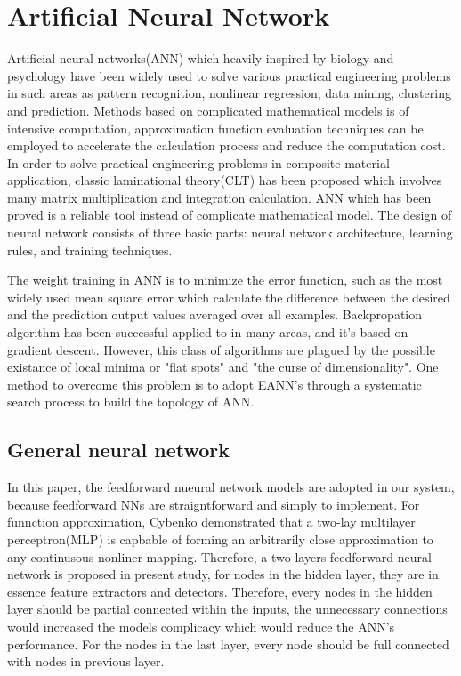 \section{Artificial Neural Network}
Artificial neural networks(ANN) which heavily inspired by biology and psychology
have been widely used to solve various practical engineering problems in such
areas as pattern recognition, nonlinear regression, data mining, clustering and
prediction. Methods based on complicated mathematical models is of intensive
computation, approximation function evaluation techniques can be employed to
accelerate the calculation process and reduce the computation cost. In order to
solve practical engineering problems in composite material application, classic
laminational theory(CLT) has been proposed which involves many matrix
multiplication and integration calculation. ANN which has been proved is a
reliable tool instead of complicate mathematical model.  The design of neural
network consists of three basic parts: neural network architecture, learning
rules, and training techniques.

The weight training in ANN is to minimize the error function, such as the most
widely used mean square error which calculate the difference  between the
desired and the prediction output values averaged over all examples.
Backpropation algorithm has been successful applied to in many areas, and it's
based on gradient descent. However, this class of algorithms are  plagued by
the possible existance of local minima or "flat spots" and "the curse of
dimensionality". One method to overcome this problem is to adopt
EANN's\cite{yao1999evolving} through a systematic search process\cite{elsken2019neural} to build
the topology of ANN.

\subsection{General neural network}

In this paper, the feedforward nueural network models are adopted in our
system, because feedforward NNs are straigntforward and simply to implement.  For
funnction approximation, Cybenko demonstrated that a two-lay multilayer
perceptron(MLP) is capbable of forming an arbitrarily close approximation to
any continusous nonliner mapping\cite{cybenko1989approximation}. Therefore, a
two layers feedforward neural network is proposed in present study, for nodes
in the hidden layer, they are in essence feature extractors and detectors.
Therefore, every nodes in the hidden layer should be partial connected within
the inputs, the unnecessary connections would increased the models complicacy
which would reduce the ANN's performance. For the nodes in the last layer,
every node should be full connected with nodes in previous layer.


